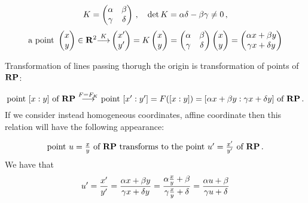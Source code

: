 \documentclass[12pt]{article}
\numberwithin{equation}{section}
\begin{document}
    \begin{equation*}
K=\begin{pmatrix}\alpha &\beta\cr \gamma &\delta\cr\end{pmatrix}\,,
      \quad \det K=\alpha\delta-\beta\gamma\not=0\,,
        \end{equation*}
    \begin{equation*}
\hbox {a  point}\,\,
 \begin{pmatrix} x\cr y\cr\end{pmatrix}
     \in \R^2
{\buildrel K\over \longrightarrow} 
       \begin{pmatrix}
        x'\cr
        y'\cr
   \end{pmatrix}
      =
     K
      \begin{pmatrix}
        x\cr
        y\cr
   \end{pmatrix}
    =
\begin{pmatrix}\alpha &\beta\cr \gamma &\delta\cr\end{pmatrix}
    \begin{pmatrix}
        x\cr
        y\cr
   \end{pmatrix}=
    \begin{pmatrix}
        \alpha x+\beta y\cr
        \gamma x+\delta y\cr
   \end{pmatrix}
        \end{equation*}
       
  

\centerline  {Transformation of lines passing thorugh the origin 
is  transformation of points of ${\bf R}{\bf P}$:}
         \begin{equation*}
\hbox{point $[x:y]$ of $\R\P$} 
               \,\,
 {\buildrel {F=F_K}\over \longrightarrow }
            \,\,
\hbox{point $[x':y']=F([x:y])=
[\a x+\beta y:\gamma x+\delta y]$ of $\R\P$}\,. 
         \end{equation*}
 If we consider instead homogeneous coordinates, affine coordinate then
  this relation will have the following appearance:


         \begin{equation*}
\hbox{point $u={x\over y}$ of ${\bf R}{\bf P}$} 
 \,\,\hbox{transforms to the }
\hbox{point $u'={x'\over y'}$ of ${\bf R}{\bf P}$}\,. 
         \end{equation*}
We have that
         \begin{equation}\label{projtransofline}
u'={x'\over y'}=
{\alpha x+\beta y\over \gamma x+\delta y}=
{\alpha {x\over y}+\beta \over \gamma {x \over y}+\delta }=
  {\alpha u+\beta\over \gamma u+\delta}
         \end{equation}
\end{document}
